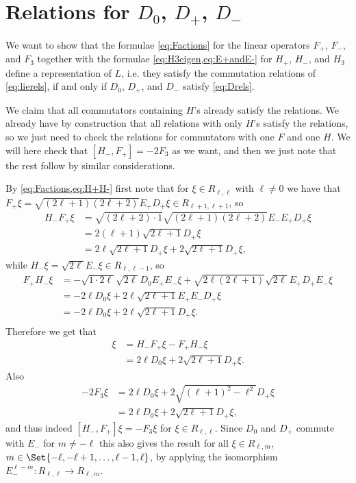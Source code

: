 \section{\texorpdfstring{Relations for $D_0$, $D_+$, $D_-$}{Relations for D\_0,D\_+,D\_-}}

We want to show that the formulae \cref{eq:Factions} for the linear operators $F_+$, $F_-$, and $F_3$ together with the formulae \cref{eq:H3eigen,eq:E+andE-} for $H_+$, $H_-$, and $H_3$ define a representation of $L$, i.e. they satisfy the commutation relations of \cref{eq:lierels}, if and only if $D_0$, $D_+$, and $D_-$ satisfy \cref{eq:Drels}.

We claim that all commutators containing $H$'s already satisfy the relations. We already have by construction that all relations with only $H$'s satisfy the relations, so we just need to check the relations for commutators with one $F$ and one $H$. We will here check that $[H_-,F_+] = -2F_3$ as we want, and then we just note that the rest follow by similar considerations.

By \cref{eq:Factions,eq:H+H-} first note that for $\xi\in R_{\ell,\ell}$ with $\ell\neq 0$ we have that $F_+\xi = \sqrt{(2\ell+1)(2\ell+2)}E_+D_+\xi\in R_{\ell+1,\ell+1}$, so
\begin{align*}
  H_-F_+ \xi &= \sqrt{(2\ell+2)\cdot 1}\sqrt{(2\ell+1)(2\ell+2)}E_-E_+D_+\xi \\
           &= 2(\ell+1)\sqrt{2\ell+1}D_+\xi \\
           &= 2\ell\sqrt{2\ell+1}D_+\xi + 2\sqrt{2\ell+1}D_+\xi,
\end{align*}
while $H_-\xi = \sqrt{2\ell}E_-\xi \in R_{\ell,\ell-1}$, so
\begin{align*}
  F_+H_- \xi &= -\sqrt{1\cdot2\ell}\sqrt{2\ell}D_0E_+E_-\xi + \sqrt{2\ell(2\ell+1)}\sqrt{2\ell}E_+D_+E_-\xi \\
           &= -2\ell D_0 \xi + 2\ell\sqrt{2\ell+1}E_+E_-D_+\xi \\
           &= -2\ell D_0 \xi + 2\ell\sqrt{2\ell+1} D_+ \xi. \\
\end{align*}
Therefore we get that
\begin{align*}
  [H_-,F_+] \xi &= H_-F_+ \xi - F_+H_- \xi \\
  &= 2\ell D_0\xi + 2\sqrt{2\ell+1}D_+\xi.
\end{align*}
Also
\begin{align*}
  -2F_3 \xi &= 2\ell D_0\xi + 2\sqrt{(\ell+1)^2-\ell^2} D_+\xi \\
  &= 2\ell D_0\xi + 2\sqrt{2\ell+1} D_+\xi,
\end{align*}
and thus indeed $[H_-,F_+]\xi = -F_3\xi$ for $\xi\in R_{\ell,\ell}$. Since $D_0$ and $D_+$ commute with $E_-$ for $m\neq -\ell$ this also gives the result for all $\xi\in R_{\ell,m}$, $m\in\Set{-\ell,-\ell+1,\dotsc,\ell-1,\ell}$, by applying the isomorphism $E_-^{\ell-m}\colon R_{\ell,\ell} \to R_{\ell,m}$.

